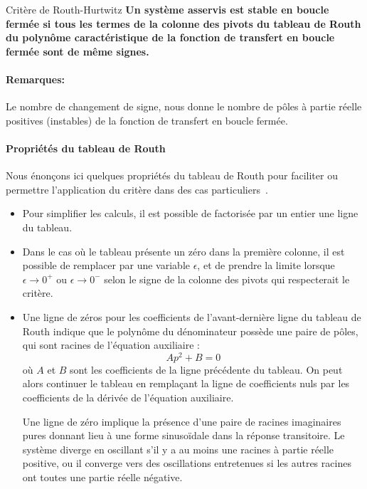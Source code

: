 \begin{criteria}{Critère de Routh-Hurtwitz}
    \textbf{Un système asservis est stable en boucle fermée
            si tous les termes de la colonne des pivots 
            du tableau de Routh du polynôme caractéristique 
            de la fonction de transfert en boucle fermée sont de même signes.}
\end{criteria}

\paragraph{Remarques:}
Le nombre de changement de signe, nous donne le nombre de pôles à partie réelle positives (instables)
de la fonction de transfert en boucle fermée.


\paragraph{Propriétés du tableau de Routh}

Nous énonçons ici quelques propriétés du tableau de Routh 
pour faciliter ou permettre l'application du critère dans 
des cas particuliers~\cite{Ostertag}. 

\begin{itemize}
    \item Pour simplifier les calculs, il est possible de factorisée par un entier une ligne du tableau.
    \item Dans le cas où le tableau présente un zéro dans la première 
          colonne, il est possible de remplacer par une variable $\epsilon$, et de prendre la limite
          lorsque $\epsilon\rightarrow 0^+$ ou $\epsilon\rightarrow 0^-$ selon le signe de la colonne des pivots
          qui respecterait le critère.
    \item Une ligne de zéros pour les coefficients de l'avant-dernière ligne du tableau de
    Routh indique que le polynôme du dénominateur possède une paire de pôles, qui sont racines de l'équation auxiliaire :
    $$
    Ap^2+B=0
    $$
    où $A$ et $B$ sont les coefficients de la ligne précédente du tableau. On peut alors continuer le tableau en remplaçant la
    ligne de coefficients nuls par les coefficients de la dérivée de l'équation auxiliaire.
    
    Une ligne de zéro implique la présence d'une paire de racines imaginaires pures
    donnant lieu à une forme sinuso\"idale dans la réponse transitoire.
    Le système diverge en oscillant s'il y a au moins une racines à partie réelle positive,
    ou il converge vers des oscillations entretenues si les autres racines ont toutes une partie réelle négative.

\end{itemize}

